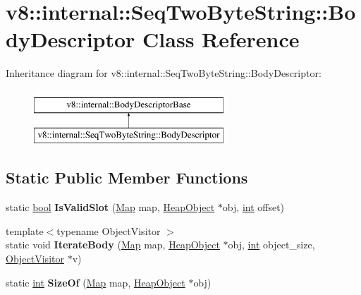 \hypertarget{classv8_1_1internal_1_1SeqTwoByteString_1_1BodyDescriptor}{}\section{v8\+:\+:internal\+:\+:Seq\+Two\+Byte\+String\+:\+:Body\+Descriptor Class Reference}
\label{classv8_1_1internal_1_1SeqTwoByteString_1_1BodyDescriptor}
Inheritance diagram for v8\+:\+:internal\+:\+:Seq\+Two\+Byte\+String\+:\+:Body\+Descriptor\+:\begin{figure}[H]
\begin{center}
\leavevmode
\includegraphics[height=2.000000cm]{classv8_1_1internal_1_1SeqTwoByteString_1_1BodyDescriptor}
\end{center}
\end{figure}
\subsection*{Static Public Member Functions}
\begin{DoxyCompactItemize}
\item 
\mbox{\label{classv8_1_1internal_1_1SeqTwoByteString_1_1BodyDescriptor_ac023e60b2fb6f34ff7922490520d7d52}} 
static \mbox{\hyperlink{classbool}{bool}} {\bfseries Is\+Valid\+Slot} (\mbox{\hyperlink{classv8_1_1internal_1_1Map}{Map}} map, \mbox{\hyperlink{classv8_1_1internal_1_1HeapObject}{Heap\+Object}} $\ast$obj, \mbox{\hyperlink{classint}{int}} offset)
\item 
\mbox{\label{classv8_1_1internal_1_1SeqTwoByteString_1_1BodyDescriptor_ac725d23a7b3ce3895a2285076fc8c4f2}} 
{\footnotesize template$<$typename Object\+Visitor $>$ }\\static void {\bfseries Iterate\+Body} (\mbox{\hyperlink{classv8_1_1internal_1_1Map}{Map}} map, \mbox{\hyperlink{classv8_1_1internal_1_1HeapObject}{Heap\+Object}} $\ast$obj, \mbox{\hyperlink{classint}{int}} object\+\_\+size, \mbox{\hyperlink{classv8_1_1internal_1_1ObjectVisitor}{Object\+Visitor}} $\ast$v)
\item 
\mbox{\label{classv8_1_1internal_1_1SeqTwoByteString_1_1BodyDescriptor_abed344ee476cfb5d12a28d2e5b65104c}} 
static \mbox{\hyperlink{classint}{int}} {\bfseries Size\+Of} (\mbox{\hyperlink{classv8_1_1internal_1_1Map}{Map}} map, \mbox{\hyperlink{classv8_1_1internal_1_1HeapObject}{Heap\+Object}} $\ast$obj)
\end{DoxyCompactItemize}
